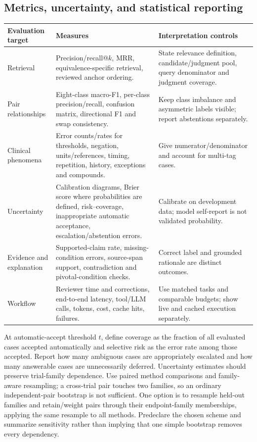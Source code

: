 \documentclass[10pt,letterpaper]{article}
\begin{document}
\subsection{Metrics, uncertainty, and statistical reporting}
\begin{longtable}{L{.22\linewidth}L{.40\linewidth}L{.29\linewidth}}
\toprule Evaluation target & Measures & Interpretation controls\\\midrule
\endhead
Retrieval & Precision/recall@$k$, MRR, equivalence-specific retrieval, reviewed anchor ordering. & State relevance definition, candidate/judgment pool, query denominator and judgment coverage.\\
Pair relationships & Eight-class macro-F1, per-class precision/recall, confusion matrix, directional F1 and swap consistency. & Keep class imbalance and asymmetric labels visible; report abstentions separately.\\
Clinical phenomena & Error counts/rates for thresholds, negation, units/references, timing, repetition, history, exceptions and compounds. & Give numerator/denominator and account for multi-tag cases.\\
Uncertainty & Calibration diagrams, Brier score where probabilities are defined, risk--coverage, inappropriate automatic acceptance, escalation/abstention errors. & Calibrate on development data; model self-report is not validated probability.\\
Evidence and explanation & Supported-claim rate, missing-condition errors, source-span support, contradiction and pivotal-condition checks. & Correct label and grounded rationale are distinct outcomes.\\
Workflow & Reviewer time and corrections, end-to-end latency, tool/LLM calls, tokens, cost, cache hits, failures. & Use matched tasks and comparable budgets; show live and cached execution separately.\\\bottomrule
\end{longtable}

At automatic-accept threshold $t$, define coverage as the fraction of all
evaluated cases accepted automatically and selective risk as the error rate
among those accepted. Report how many ambiguous cases are appropriately
escalated and how many answerable cases are unnecessarily deferred.
Uncertainty estimates should preserve trial-family dependence. Use paired
method comparisons and family-aware resampling; a cross-trial pair touches
two families, so an ordinary independent-pair bootstrap is not sufficient.
One option is to resample held-out families and retain/weight pairs through
their endpoint-family memberships, applying the same resample to all methods.
Predeclare the chosen scheme and summarize sensitivity rather than implying
that one simple bootstrap removes every dependency.
\end{document}
